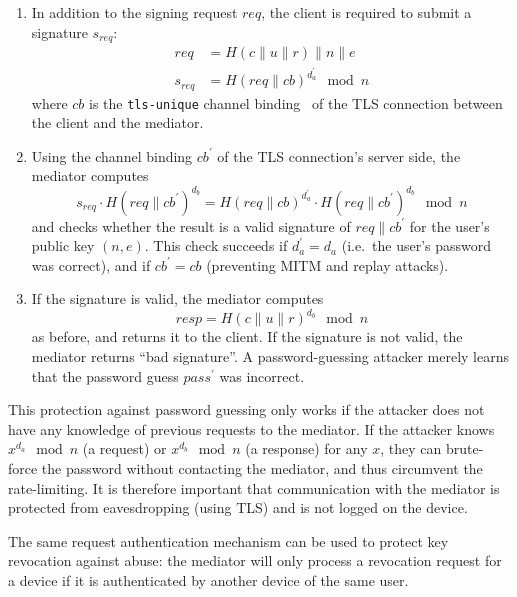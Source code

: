 \documentclass{llncs}
\newcommand*{\concat}{\mathbin{\|}}
\begin{document}
\begin{enumerate}
\item In addition to the signing request $\mathit{req}$, the client is required to submit a
signature $s_\mathit{req}$:
\begin{align}
    \mathit{req} &= H(c \concat u \concat r) \concat n \concat e \\
    s_\mathit{req} &= H(\mathit{req} \concat \mathit{cb})^{d_a^\prime} \mod n
\end{align}
where $\mathit{cb}$ is the \texttt{tls-unique} channel binding~\cite{ChannelBinding}
of the TLS connection between the client and the mediator.
\item Using the channel binding $\mathit{cb}^\prime$ of the TLS connection's server side, the
mediator computes
\begin{equation}
s_\mathit{req} \cdot H(\mathit{req} \concat \mathit{cb}^\prime)^{d_b} =
  H(\mathit{req} \concat \mathit{cb})^{d_a^\prime} \cdot
  H(\mathit{req} \concat \mathit{cb}^\prime)^{d_b} \mod n
\end{equation}
and checks whether the result is a valid signature of $\mathit{req} \concat \mathit{cb}^\prime$ for
the user's public key $(n, e)$. This check succeeds if $d_a^\prime = d_a$ (i.e.\ the user's password
was correct), and if $\mathit{cb}^\prime = \mathit{cb}$ (preventing MITM and replay attacks).
\item If the signature is valid, the mediator computes
\begin{equation}
\mathit{resp} = H(c \concat u \concat r)^{d_b} \mod n
\end{equation}
as before, and returns it to the client. If the signature is not valid, the mediator returns ``bad
signature''. A password-guessing attacker merely learns that the password guess
$\mathit{pass}^\prime$ was incorrect.
\end{enumerate}

This protection against password guessing only works if the attacker does not have any knowledge of
previous requests to the mediator. If the attacker knows $x^{d_a} \mod n$ (a request) or
$x^{d_b} \mod n$ (a response) for any $x$, they can brute-force the password without contacting the
mediator, and thus circumvent the rate-limiting.  It is therefore important that communication with
the mediator is protected from eavesdropping (using TLS) and is not logged on the device.

The same request authentication mechanism can be used to protect key revocation against abuse: the
mediator will only process a revocation request for a device if it is authenticated by another
device of the same user.
\end{document}
